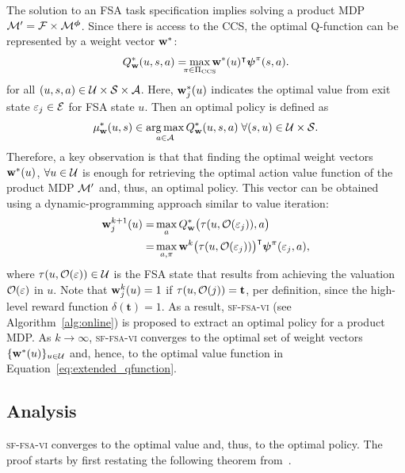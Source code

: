 The solution to an FSA task specification implies solving a product MDP $\mathcal{M}'=\mathcal{F}\times\mathcal{M}^{\boldsymbol{\phi}}$. Since there is access to the CCS, the optimal Q-function can be represented by a weight vector $\mathbf{w}^*$:
\begin{equation}
    Q^*_\w(u,s,a) = \smashoperator{\max_{\pi\in\Pi_\text{CCS}}} \w^*(u)^{\intercal}\boldsymbol{\psi}^\pi(s,a).
    \label{eq:extended_qfunction}
\end{equation}
for all $(u,s,a)\in\mathcal{U}\times\mathcal{S}\times\mathcal{A}$. Here, $\mathbf{w}_j^*(u)$ indicates the optimal value from exit state $\varepsilon_j\in\mathcal{E}$ for FSA state $u$. Then an optimal policy is defined as
\begin{equation}
    \mu^*_{\mathbf{w}}(u, s) \in \operatorname*{arg\,max}_{a\in\mathcal{A}} Q^*_{\mathbf{w}}(u,s,a)\;\forall(s,u)\in\mathcal{U}\times\mathcal{S}.
    \label{eq:hl-policy}    
\end{equation}
Therefore, a key observation is that that finding the optimal weight vectors $\mathbf{w}^*(u)$, ${\forall u\in\mathcal{U}}$ is enough for retrieving the optimal action value function of the product MDP $\mathcal{M}'$ and, thus, an optimal policy.
This vector can be obtained using a dynamic-programming approach similar to value iteration: 
\begin{align}
\mathbf{w}_j^{k+1}(u) =&  \max_a Q^*_{\mathbf{w}}\bigl(\tau(u,\mathcal{O}(\varepsilon_j)),a\bigr) \\
              =& 
    \max_{a,\pi} \mathbf{w}^k\bigl(\tau(u,\mathcal{O}(\varepsilon_j))\bigr)^{\intercal} \boldsymbol{\psi}^\pi (\varepsilon_j,a),  
    \label{eq:update_rule}
\end{align}
where $\tau(u,\mathcal{O}(\varepsilon))\in\mathcal{U}$ is the FSA state that results from achieving the valuation $\mathcal{O}(\varepsilon)$ in $u$. Note that $\mathbf{w}^k_j(u)=1$ if $\tau(u,\mathcal{O}(j))=\textbf{t}$, per definition, since the high-level reward function $\delta(\mathbf{t})=1$. 
As a result, \textsc{sf-fsa-vi} (see Algorithm~\ref{alg:online}) is proposed to extract an optimal policy for a product MDP. As $k\rightarrow\infty$, \textsc{sf-fsa-vi} converges to the optimal set of weight vectors $\{\mathbf{w}^*(u)\}_{u\in\mathcal{U}}$ and, hence, to the optimal value function in Equation~\eqref{eq:extended_qfunction}.



\subsection{Analysis} 
\textsc{sf-fsa-vi} converges to the optimal value and, thus, to the optimal policy. The proof starts by first restating the following theorem from~\citep{Alegre2022}.


